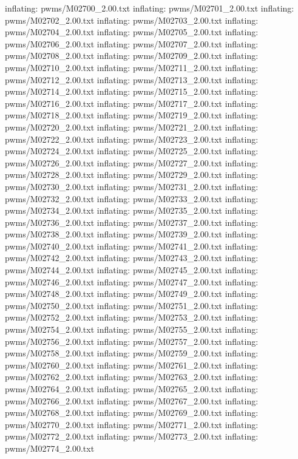 \documentclass[letterpaper,10pt,english]{sphinxmanual}
\begin{document}
{\begin{sphinxVerbatim}[commandchars=\\\{\}]
  inflating: pwms/M02700\_2.00.txt
  inflating: pwms/M02701\_2.00.txt
  inflating: pwms/M02702\_2.00.txt
  inflating: pwms/M02703\_2.00.txt
  inflating: pwms/M02704\_2.00.txt
  inflating: pwms/M02705\_2.00.txt
  inflating: pwms/M02706\_2.00.txt
  inflating: pwms/M02707\_2.00.txt
  inflating: pwms/M02708\_2.00.txt
  inflating: pwms/M02709\_2.00.txt
  inflating: pwms/M02710\_2.00.txt
  inflating: pwms/M02711\_2.00.txt
  inflating: pwms/M02712\_2.00.txt
  inflating: pwms/M02713\_2.00.txt
  inflating: pwms/M02714\_2.00.txt
  inflating: pwms/M02715\_2.00.txt
  inflating: pwms/M02716\_2.00.txt
  inflating: pwms/M02717\_2.00.txt
  inflating: pwms/M02718\_2.00.txt
  inflating: pwms/M02719\_2.00.txt
  inflating: pwms/M02720\_2.00.txt
  inflating: pwms/M02721\_2.00.txt
  inflating: pwms/M02722\_2.00.txt
  inflating: pwms/M02723\_2.00.txt
  inflating: pwms/M02724\_2.00.txt
  inflating: pwms/M02725\_2.00.txt
  inflating: pwms/M02726\_2.00.txt
  inflating: pwms/M02727\_2.00.txt
  inflating: pwms/M02728\_2.00.txt
  inflating: pwms/M02729\_2.00.txt
  inflating: pwms/M02730\_2.00.txt
  inflating: pwms/M02731\_2.00.txt
  inflating: pwms/M02732\_2.00.txt
  inflating: pwms/M02733\_2.00.txt
  inflating: pwms/M02734\_2.00.txt
  inflating: pwms/M02735\_2.00.txt
  inflating: pwms/M02736\_2.00.txt
  inflating: pwms/M02737\_2.00.txt
  inflating: pwms/M02738\_2.00.txt
  inflating: pwms/M02739\_2.00.txt
  inflating: pwms/M02740\_2.00.txt
  inflating: pwms/M02741\_2.00.txt
  inflating: pwms/M02742\_2.00.txt
  inflating: pwms/M02743\_2.00.txt
  inflating: pwms/M02744\_2.00.txt
  inflating: pwms/M02745\_2.00.txt
  inflating: pwms/M02746\_2.00.txt
  inflating: pwms/M02747\_2.00.txt
  inflating: pwms/M02748\_2.00.txt
  inflating: pwms/M02749\_2.00.txt
  inflating: pwms/M02750\_2.00.txt
  inflating: pwms/M02751\_2.00.txt
  inflating: pwms/M02752\_2.00.txt
  inflating: pwms/M02753\_2.00.txt
  inflating: pwms/M02754\_2.00.txt
  inflating: pwms/M02755\_2.00.txt
  inflating: pwms/M02756\_2.00.txt
  inflating: pwms/M02757\_2.00.txt
  inflating: pwms/M02758\_2.00.txt
  inflating: pwms/M02759\_2.00.txt
  inflating: pwms/M02760\_2.00.txt
  inflating: pwms/M02761\_2.00.txt
  inflating: pwms/M02762\_2.00.txt
  inflating: pwms/M02763\_2.00.txt
  inflating: pwms/M02764\_2.00.txt
  inflating: pwms/M02765\_2.00.txt
  inflating: pwms/M02766\_2.00.txt
  inflating: pwms/M02767\_2.00.txt
  inflating: pwms/M02768\_2.00.txt
  inflating: pwms/M02769\_2.00.txt
  inflating: pwms/M02770\_2.00.txt
  inflating: pwms/M02771\_2.00.txt
  inflating: pwms/M02772\_2.00.txt
  inflating: pwms/M02773\_2.00.txt
  inflating: pwms/M02774\_2.00.txt

\end{sphinxVerbatim}}
\end{document}
